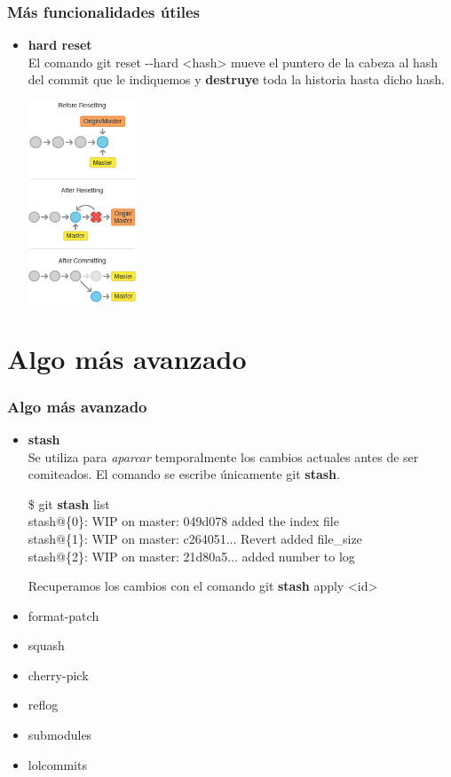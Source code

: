 \frame
{
\frametitle{Más funcionalidades útiles}
\begin{itemize}
 \item \textbf{hard reset}\\ \indent
 El comando git reset -{}-hard <hash> mueve el puntero de la cabeza al hash del commit que le indiquemos y \textbf{destruye} toda la historia hasta dicho hash.\\
 \begin{center}
    \includegraphics[height=6cm]{imgs/reset-hard.png}
 \end{center}
\end{itemize}
}

\section{Algo más avanzado}
\frame
{
\frametitle{Algo más avanzado}
\begin{itemize}
 \item \textbf{stash}\\ \indent
Se utiliza para \textit{aparcar} temporalmente los cambios actuales antes de ser comiteados. El comando se escribe únicamente git \textbf{stash}.
\begin{framed}
\$ git \textbf{stash} list\\
stash@\{0\}: WIP on master: 049d078 added the index file\\
stash@\{1\}: WIP on master: c264051... Revert added file\_size\\
stash@\{2\}: WIP on master: 21d80a5... added number to log
\end{framed}

Recuperamos los cambios con el comando git \textbf{stash} apply <id>

 \item format-patch
 \item squash
 \item cherry-pick
 \item reflog 
 \item submodules
 \item lolcommits 
\end{itemize}
}

